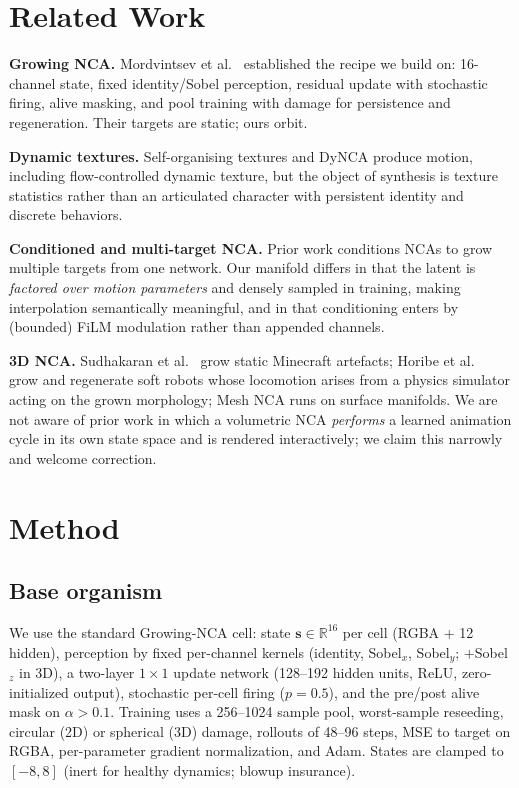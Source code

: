 \documentclass[11pt]{article}
\begin{document}
\section{Related Work}

\textbf{Growing NCA.} Mordvintsev et al.~\cite{mordvintsev2020growing}
established the recipe we build on: 16-channel state, fixed
identity/Sobel perception, residual update with stochastic firing, alive
masking, and pool training with damage for persistence and regeneration. Their
targets are static; ours orbit.

\textbf{Dynamic textures.} Self-organising textures
\cite{niklasson2021texture} and DyNCA \cite{pajouheshgar2023dynca} produce
motion, including flow-controlled dynamic texture, but the object of synthesis
is texture statistics rather than an articulated character with persistent
identity and discrete behaviors.

\textbf{Conditioned and multi-target NCA.} Prior work conditions NCAs to grow
multiple targets from one network. Our manifold differs in that the latent is
\emph{factored over motion parameters} and densely sampled in training, making
interpolation semantically meaningful, and in that conditioning enters by
(bounded) FiLM modulation rather than appended channels.

\textbf{3D NCA.} Sudhakaran et al.~\cite{sudhakaran2021growing} grow static
Minecraft artefacts; Horibe et al.~\cite{horibe2021regenerating} grow and
regenerate soft robots whose locomotion arises from a physics simulator acting
on the grown morphology; Mesh NCA \cite{pajouheshgar2024mesh} runs on surface
manifolds. We are not aware of prior work in which a volumetric NCA
\emph{performs} a learned animation cycle in its own state space and is
rendered interactively; we claim this narrowly and welcome correction.

\section{Method}

\subsection{Base organism}
We use the standard Growing-NCA cell: state
$\mathbf{s} \in \mathbb{R}^{16}$ per cell (RGBA + 12 hidden), perception by
fixed per-channel kernels (identity, Sobel$_x$, Sobel$_y$; $+$Sobel$_z$ in
3D), a two-layer $1{\times}1$ update network (128--192 hidden units, ReLU,
zero-initialized output), stochastic per-cell firing ($p{=}0.5$), and the
pre/post alive mask on $\alpha > 0.1$. Training uses a 256--1024 sample pool,
worst-sample reseeding, circular (2D) or spherical (3D) damage, rollouts of
48--96 steps, MSE to target on RGBA, per-parameter gradient normalization, and
Adam. States are clamped to $[-8, 8]$ (inert for healthy dynamics; blowup
insurance).
\end{document}

